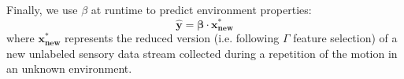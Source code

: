 Finally, we use $\beta$ at runtime to predict environment properties:
  \begin{equation} \mathbf{\hat{y}} = \mathbf{\beta} \cdot \mathbf{x^*_{new}} \end{equation}
where $\mathbf{x^*_{new}}$ represents the reduced version (i.e. following $\Gamma$ feature selection) of a new unlabeled sensory data stream collected during a repetition of the motion in an unknown environment.

